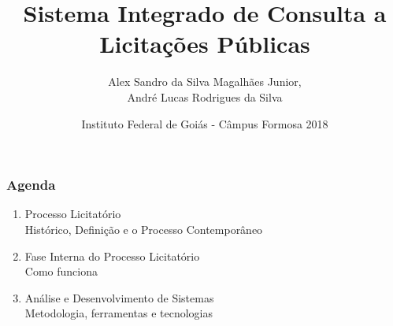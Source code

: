 \documentclass{beamer}
\title{Sistema Integrado de Consulta a Licitações Públicas}
\subtitle{Alex Sandro da Silva Magalhães Junior,\\ André Lucas Rodrigues da Silva}
\author{Instituto Federal de Goiás - Câmpus Formosa 2018}
\date{}
\begin{document}
	\setcounter{showProgressBar}{0}
	\setcounter{showSlideNumbers}{0}

	\frame{\titlepage}

	\begin{frame}
		\frametitle{Agenda}
		\begin{enumerate}
			\item Processo Licitatório\\ %
			\textcolor{ExecusharesGrey}{\footnotesize\hspace{1em} Histórico, Definição e o Processo Contemporâneo}\\
			\item Fase Interna do Processo Licitatório\\
			\textcolor{ExecusharesGrey}{\footnotesize\hspace{1em} Como funciona}\\
			\item Análise e Desenvolvimento de Sistemas \\
			\textcolor{ExecusharesGrey}{\footnotesize\hspace{1em} Metodologia, ferramentas e tecnologias}\\

\end{enumerate}
\end{frame}
\end{document}

